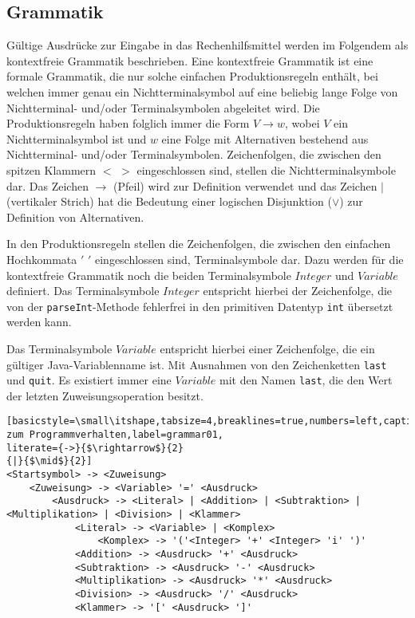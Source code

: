 \documentclass{sdqassignment}
\begin{document}
\subsection{Grammatik}
Gültige Ausdrücke zur Eingabe in das Rechenhilfsmittel werden im Folgendem als kontextfreie Grammatik beschrieben. Eine kontextfreie Grammatik ist eine formale Grammatik, die nur solche einfachen Produktionsregeln enthält, bei welchen immer genau ein Nichtterminalsymbol auf eine beliebig lange Folge von Nichtterminal- und/oder Terminalsymbolen abgeleitet wird. Die Produktionsregeln haben folglich immer die Form \(V \rightarrow w\), wobei \(V\) ein Nichtterminalsymbol ist und \(w\) eine Folge mit Alternativen bestehend aus Nichtterminal- und/oder Terminalsymbolen. Zeichenfolgen, die zwischen den spitzen Klammern \(<\) \(>\) eingeschlossen sind, stellen die Nichtterminalsymbole dar. Das Zeichen \(\rightarrow\) (Pfeil) wird zur Definition verwendet und das Zeichen \(\mid\) (vertikaler Strich) hat die Bedeutung einer logischen Disjunktion (\(\lor\)) zur Definition von Alternativen.

In den Produktionsregeln stellen die Zeichenfolgen, die zwischen den einfachen Hochkommata \('\) \('\) eingeschlossen sind, Terminalsymbole dar. Dazu werden für die kontextfreie Grammatik noch die beiden Terminalsymbole \(Integer\) und \(Variable\) definiert. Das Terminalsymbole \(Integer\) entspricht hierbei der Zeichenfolge, die von der \texttt{parseInt}-Methode fehlerfrei in den primitiven Datentyp \texttt{int} übersetzt werden kann.

Das Terminalsymbole \(Variable\) entspricht hierbei einer Zeichenfolge, die ein gültiger Java-Variablenname ist. Mit Ausnahmen von den Zeichenketten \texttt{last} und \texttt{quit}. Es existiert immer eine \(Variable\) mit den Namen \texttt{last}, die den Wert der letzten Zuweisungsoperation besitzt.

\begin{lstlisting}[basicstyle=\small\itshape,tabsize=4,breaklines=true,numbers=left,caption=Grammatik zum Programmverhalten,label=grammar01,
literate={->}{$\rightarrow$}{2}
{|}{$\mid$}{2}]
<Startsymbol> -> <Zuweisung> 
	<Zuweisung> -> <Variable> '=' <Ausdruck>	
		<Ausdruck> -> <Literal> | <Addition> | <Subtraktion> | <Multiplikation> | <Division> | <Klammer>		
			<Literal> -> <Variable> | <Komplex>			
				<Komplex> -> '('<Integer> '+' <Integer> 'i' ')'
			<Addition> -> <Ausdruck> '+' <Ausdruck>
			<Subtraktion> -> <Ausdruck> '-' <Ausdruck>
			<Multiplikation> -> <Ausdruck> '*' <Ausdruck>
			<Division> -> <Ausdruck> '/' <Ausdruck>
			<Klammer> -> '[' <Ausdruck> ']'
\end{lstlisting}
\end{document}
